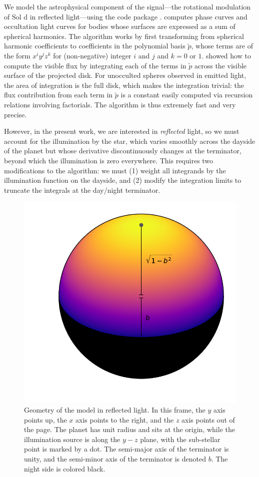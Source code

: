 \documentclass[modern]{aastex62}
\begin{document}
We model the astrophysical component of the signal---the rotational modulation
of Sol d in reflected light---using the \starry code package \citep{Luger2019}.
\starry computes phase curves and occultation light curves for bodies whose
surfaces are expressed as a sum of spherical harmonics. 
The algorithm works by first transforming
from spherical harmonic coefficients to coefficients in the polynomial basis $\tilde{p}$, whose
terms are of the form $x^i y^j z^k$ for (non-negative) integer $i$ and $j$ 
and $k = 0$ or $1$. \citet{Luger2019} showed how to compute the visible
flux by integrating each of the terms in $\tilde{p}$ across the visible
surface of the projected disk. For unocculted spheres observed in emitted
light, the area of integration is the full disk, which makes the integration
trivial: the flux contribution from each term in $\tilde{p}$ is a constant
easily computed via recursion relations involving factorials. The algorithm is
thus extremely fast and very precise.

However, in the present work, we are interested in \emph{reflected} light, so we must
account for the illumination by the star, which varies smoothly
across the dayside of the planet but whose derivative discontinuously changes at the 
terminator, beyond which the illumination is zero everywhere. This requires
two modifications to the \starry algorithm: we must (1) weight all integrands
by the illumination function on the dayside, and (2) modify the integration
limits to truncate the integrals at the day/night terminator.

\begin{figure}[ht!]
    \begin{centering}
    \includegraphics[width=0.4\linewidth]{figures/geometry.pdf}
    \caption{\label{fig:geometry}
             Geometry of the \starry model in reflected light. In this frame, 
             the $y$ axis points up, 
             the $x$ axis points to the right, and the $z$ axis points out of the page.
             The planet has unit radius and sits at the origin, while
             the illumination source is along the $y-z$ plane, with the sub-stellar point is
             marked by a dot. The semi-major axis of the terminator is unity, and
             the semi-minor axis of the terminator is denoted $b$. The night side
             is colored black.
             }
    \end{centering}
\end{figure}
\end{document}
